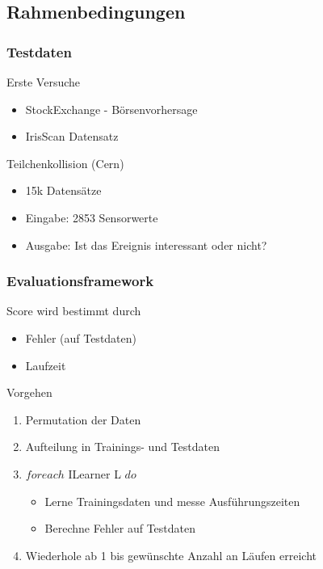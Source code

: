 \documentclass[18pt]{beamer}
\begin{document}
	\subsection{Rahmenbedingungen}
	\begin{frame}[c]\frametitle{Testdaten}
		\begin{block}{Erste Versuche}
		    \begin{itemize}
		    	\item StockExchange - Börsenvorhersage
		    	\item IrisScan Datensatz
		    \end{itemize}
		\end{block}
		\begin{block}{Teilchenkollision (Cern)}
		    \begin{itemize}
		    	\item 15k Datensätze
		    	\item Eingabe: 2853 Sensorwerte
				\item Ausgabe: Ist das Ereignis interessant oder nicht? 
		    \end{itemize}
		\end{block}		
	\end{frame}

	\begin{frame}\frametitle{Evaluationsframework}
		\begin{block}{Score}
			wird bestimmt durch
		    \begin{itemize}
		    	\item Fehler (auf Testdaten)
		    	\item Laufzeit
		    \end{itemize}
		\end{block}
		\begin{block}{Vorgehen}
		    \begin{enumerate}
		    	\item Permutation der Daten
		    	\item Aufteilung in Trainings- und Testdaten
				\item $foreach$ ILearner L $do$
				\begin{itemize}
					\item Lerne Trainingsdaten und messe Ausführungszeiten
					\item Berechne Fehler auf Testdaten
				\end{itemize}
				\item Wiederhole ab 1 bis gewünschte Anzahl an Läufen erreicht
		    \end{enumerate}
		\end{block}
	\end{frame}
\end{document}
